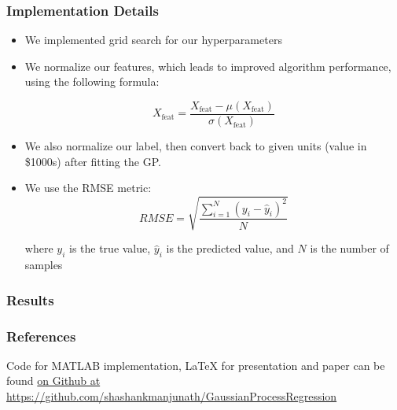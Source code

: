 \documentclass[pdf]{beamer}
\begin{document}
\begin{frame}
  \frametitle{Implementation Details}

  \begin{itemize}
    \item We implemented grid search for our hyperparameters
    \item We normalize our features, which leads to improved algorithm performance, using the following
      formula:

      \[
        X_{\text{feat}} = \frac{X_{\text{feat}} - \mu(X_{\text{feat}})}{\sigma(X_{\text{feat}})}
      \]
    \item We also normalize our label, then convert back to given units (value in \$1000s) after fitting the GP.
    \item We use the RMSE metric:
      \[
        RMSE = \sqrt{\frac{\sum\limits_{i=1}^{N} (y_i - \hat y_i)^{2}}{N}}
      \]

      where $y_i$ is the true value, $\hat y_i$ is the predicted value, and $N$ is the number of samples

  \end{itemize}
\end{frame}

\begin{frame}
  \frametitle{Results}
\end{frame}

\begin{frame}
  \frametitle{References}
  
  

  Code for MATLAB implementation, LaTeX for presentation and paper can be found
  \href{https://github.com/shashankmanjunath/GaussianProcessRegression}{on Github at
  https://github.com/shashankmanjunath/GaussianProcessRegression}

\end{frame}
\end{document}
